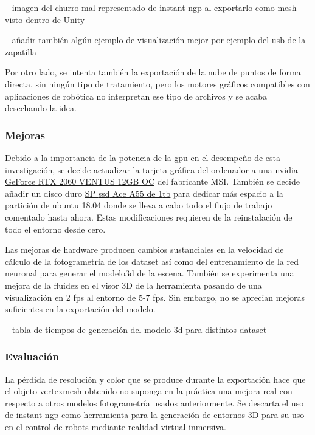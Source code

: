 \documentclass[a4paper, 12pt, spanish, twoside]{article}
\begin{document}
-- imagen del churro mal representado de instant-ngp al exportarlo como mesh visto dentro de Unity  

-- añadir también algún ejemplo de visualización mejor por ejemplo del usb de la zapatilla 

Por otro lado, se intenta también la exportación de la nube de puntos de forma directa, sin ningún tipo de tratamiento, pero los motores gráficos compatibles con aplicaciones de robótica no interpretan ese tipo de archivos y se acaba desechando la idea. 

\subsubsection{Mejoras} \label{sec:implementacion:instant-ngp:mejoras}

Debido a la importancia de la potencia de la \acrshort{gpu} en el desempeño de esta investigación, se decide actualizar la tarjeta gráfica del ordenador a una \href{https://es.msi.com/Graphics-Card/GeForce-RTX-2060-VENTUS-12G-OC}{\gls{nvidia} GeForce RTX 2060 VENTUS 12GB OC} del fabricante MSI. También se decide añadir un disco duro \href{https://www.silicon-power.com/web/es/product-Ace_A55}{SP \acrshort{ssd} Ace A55 de 1\acrshort{tb}} para dedicar más espacio a la partición de \gls{ubuntu} 18.04 donde se lleva a cabo todo el flujo de trabajo comentado hasta ahora. Estas modificaciones requieren de la reinstalación de todo el entorno desde cero. 

Las mejoras de hardware producen cambios sustanciales en la velocidad de cálculo de la \gls{fotogrametria} de los \gls{dataset} así como del entrenamiento de la red neuronal para generar el \gls{modelo3d} de la escena. También se experimenta una mejora de la fluidez en el visor 3D de la herramienta pasando de una visualización en 2 \acrshort{fps} al entorno de 5-7 \acrshort{fps}. Sin embargo, no se aprecian mejoras suficientes en la exportación del modelo. 

-- tabla de tiempos de generación del modelo 3d para distintos dataset 

\subsubsection{Evaluación} \label{sec:implementacion:instant-ngp:evaluacion}

La pérdida de resolución y color que se produce durante la exportación hace que el objeto \gls{vertexmesh} obtenido no suponga en la práctica una mejora real con respecto a otros modelos fotogrametría usados anteriormente. Se descarta el uso de \gls{instant-ngp} como herramienta para la generación de entornos 3D para su uso en el control de robots mediante realidad virtual inmersiva. 
\end{document}

